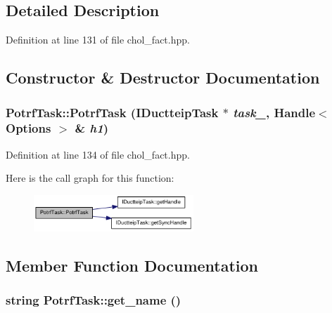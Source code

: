 \subsection{Detailed Description}


Definition at line 131 of file chol\_\-fact.hpp.

\subsection{Constructor \& Destructor Documentation}
\hypertarget{struct_potrf_task_a91fdd6aa7f492dad620f3c10addf5c06}{
\subsubsection[{PotrfTask}]{\setlength{\rightskip}{0pt plus 5cm}PotrfTask::PotrfTask ({\bf IDuctteipTask} $\ast$ {\em task\_\-}, \/  Handle$<$ {\bf Options} $>$ \& {\em h1})}}
\label{struct_potrf_task_a91fdd6aa7f492dad620f3c10addf5c06}


Definition at line 134 of file chol\_\-fact.hpp.

Here is the call graph for this function:\nopagebreak
\begin{figure}[H]
\begin{center}
\leavevmode
\includegraphics[width=170pt]{struct_potrf_task_a91fdd6aa7f492dad620f3c10addf5c06_cgraph}
\end{center}
\end{figure}


\subsection{Member Function Documentation}
\hypertarget{struct_potrf_task_a943b08be82bb47d4b1deaa381c7aafcc}{
\subsubsection[{get\_\-name}]{\setlength{\rightskip}{0pt plus 5cm}string PotrfTask::get\_\-name ()}}
\label{struct_potrf_task_a943b08be82bb47d4b1deaa381c7aafcc}


